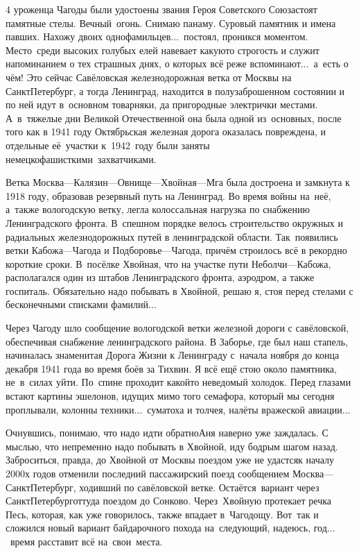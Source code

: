 4 уроженца Чагоды были удостоены звания Героя Советского Союза\mdash стоят памятные стелы. Вечный~огонь. Снимаю панаму. Суровый памятник и имена павших. Нахожу двоих однофамильцев$\ldots$~постоял, проникся моментом. Место~среди высоких голубых елей навевает какую\sdash то строгость и служит напоминанием о тех страшных днях, о которых всё реже вспоминают$\ldots$~а~есть о чём! Это сейчас Савёловская железнодорожная ветка от Москвы на Санкт\sdash Петербург, а тогда Ленинград, находится в полузаброшенном состоянии и по ней идут в~основном товарняки, да пригородные электрички местами. А~в~тяжелые дни Великой Отечественной она была одной из~основных, после того как в 1941 году Октябрьская железная дорога оказалась повреждена, и отдельные её~участки к~1942~году были заняты немецко\sdash фашисткими~захватчиками.

Ветка Москва\thinspace\nobreakdash---\thinspace Калязин\thinspace\nobreakdash---\thinspace Овнище\thinspace\nobreakdash---\thinspace Хвойная\thinspace\nobreakdash---\thinspace Мга была достроена и замкнута к 1918 году, образовав резервный путь на Ленинград. Во время войны на~неё, а~также вологодскую ветку, легла колоссальная нагрузка по снабжению Ленинградского фронта. В~спешном порядке велось строительство окружных и радиальных железнодорожных путей в ленинградской области. Так~появились ветки Кабожа\thinspace\nobreakdash---\thinspace Чагода и Подборовье\thinspace\nobreakdash---\thinspace Чагода, причём строилось всё в рекордно короткие сроки. В~посёлке Хвойная, что на участке пути Неболчи\thinspace\nobreakdash---\thinspace Кабожа, располагался один из штабов Ленинградского фронта, аэродром, а также госпиталь. Обязательно надо побывать в Хвойной, решаю я, стоя перед стелами с бесконечными списками фамилий$\ldots$

Через Чагоду шло сообщение вологодской ветки железной дороги с савёловской, обеспечивая снабжение ленинградского района. В Заборье, где был наш стапель, начиналась знаменитая Дорога Жизни к Ленинграду с~начала ноября до конца декабря 1941 года во время боёв за Тихвин. Я всё ещё стою около памятника, не~в~силах уйти. По~спине проходит какой\sdash то неведомый холодок. Перед глазами встают картины эшелонов, идущих мимо того семафора, который мы сегодня проплывали, колонны техники$\ldots$~суматоха и толчея, налёты вражеской авиации$\ldots$  

Очнувшись, понимаю, что надо идти обратно\mdash Аня наверно уже заждалась. С мыслью, что непременно надо побывать в Хвойной, иду бодрым шагом назад. Заброситься, правда, до Хвойной от Москвы поездом уже не удастся\mdash к началу 2000\sdash х годов отменили последний пассажирский поезд сообщением Москва\thinspace\nobreakdash---\thinspace Санкт\sdash Петербург, ходивший по савёловской ветке. Остаётся~вариант через Санкт\sdash Петербург\mdash оттуда поездом до Сонково. Через~Хвойную протекает речка Песь, которая, как уже говорилось, также впадает в~Чагодощу. Вот~так и сложился новый вариант байдарочного похода на~следующий, надеюсь, год$\ldots$~время расставит всё на~свои~места.

